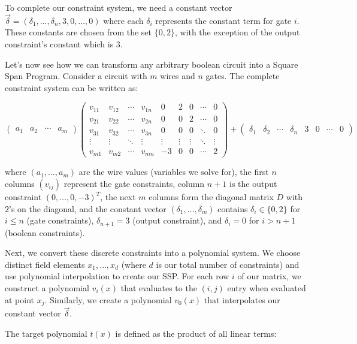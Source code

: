 \documentclass[12pt]{tufte-book}
\begin{document}
To complete our constraint system, we need a constant vector $\vec{\delta} = (\delta_1,\ldots,\delta_n,3,0,\ldots,0)$ where each $\delta_i$ represents the constant term for gate $i$. These constants are chosen from the set $\{0,2\}$, with the exception of the output constraint's constant which is 3.

Let's now see how we can transform any arbitrary boolean circuit into a Square Span Program. Consider a circuit with $m$ wires and $n$ gates. The complete constraint system can be written as:

\[ \begin{pmatrix} a_1 & a_2 & \cdots & a_m \end{pmatrix}
\begin{pmatrix}
v_{11} & v_{12} & \cdots & v_{1n} & 0 & 2 & 0 & \cdots & 0 \\
v_{21} & v_{22} & \cdots & v_{2n} & 0 & 0 & 2 & \cdots & 0 \\
v_{31} & v_{32} & \cdots & v_{3n} & 0 & 0 & 0 & \ddots & 0 \\
\vdots & \vdots & \ddots & \vdots & \vdots & \vdots & \vdots & \ddots & \vdots \\
v_{m1} & v_{m2} & \cdots & v_{mn} & -3 & 0 & 0 & \cdots & 2
\end{pmatrix} + \begin{pmatrix} \delta_1 & \delta_2 & \cdots & \delta_n & 3 & 0 & \cdots & 0 \end{pmatrix} \]

where $(a_1,\ldots,a_m)$ are the wire values (variables we solve for), the first $n$ columns $(v_{ij})$ represent the gate constraints, column $n+1$ is the output constraint $(0,\ldots,0,-3)^T$, the next $m$ columns form the diagonal matrix $D$ with $2$'s on the diagonal, and the constant vector $(\delta_1,\ldots,\delta_m)$ contains $\delta_i \in \{0,2\}$ for $i \leq n$ (gate constraints), $\delta_{n+1} = 3$ (output constraint), and $\delta_i = 0$ for $i > n+1$ (boolean constraints).

Next, we convert these discrete constraints into a polynomial system. We choose distinct field elements $x_1,\ldots,x_d$ (where $d$ is our total number of constraints) and use polynomial interpolation to create our SSP. For each row $i$ of our matrix, we construct a polynomial $v_i(x)$ that evaluates to the $(i,j)$ entry when evaluated at point $x_j$. Similarly, we create a polynomial $v_0(x)$ that interpolates our constant vector $\vec{\delta}$.

The target polynomial $t(x)$ is defined as the product of all linear terms:
\end{document}
